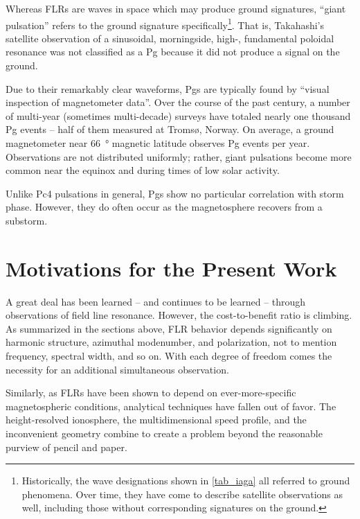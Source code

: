 Whereas FLRs are waves in space which may produce ground signatures, ``giant pulsation'' refers to the ground signature specifically\footnote{Historically, the wave designations shown in \cref{tab_iaga} 
all referred to ground phenomena. Over time, they have come to describe satellite observations as well, including those without corresponding signatures on the ground. }. That is, Takahashi's satellite observation of a sinusoidal, morningside, high-\azm, fundamental poloidal resonance was not classified as a Pg because it did not produce a signal on the ground\cite{takahashi_2013}. 

Due to their remarkably clear waveforms, Pgs are typically found by ``visual inspection of magnetometer data''\cite{motoba_2015}. Over the course of the past century, a number of multi-year (sometimes multi-decade\cite{brekke_1987}) surveys have totaled nearly one thousand Pg events -- half of them measured at Troms{\o}, Norway. On average, a ground magnetometer near \SI{66}{\degree} magnetic latitude observes  Pg events per year\cite{brekke_1987,harang_1941,rolf_1931,sucksdorff_1939}. Observations are not distributed uniformly; rather, giant pulsations become more common near the equinox and during times of low solar activity. 

Unlike Pc4 pulsations in general, Pgs show no particular correlation with storm phase\cite{motoba_2015}. However, they do often occur as the magnetosphere recovers from a substorm\cite{motoba_2015,rostoker_1979}. 

\section{Motivations for the Present Work}

A great deal has been learned -- and continues to be learned -- through observations of field line resonance. However, the cost-to-benefit ratio is climbing. As summarized in the sections above, FLR behavior depends significantly on harmonic structure, azimuthal modenumber, and polarization, not to mention frequency, spectral width, and so on. With each degree of freedom comes the necessity for an additional simultaneous observation. 

Similarly, as FLRs have been shown to depend on ever-more-specific magnetospheric conditions, analytical techniques have fallen out of favor. The height-resolved ionosphere, the multidimensional \Alfven speed profile, and the inconvenient geometry combine to create a problem beyond the reasonable purview of pencil and paper. 

